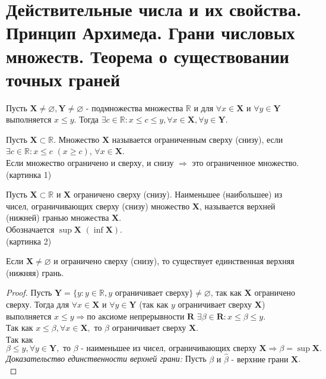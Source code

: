 \section{Действительные числа и их свойства. Принцип Архимеда. Грани числовых множеств. Теорема о существовании точных граней}

\begin{myax} 
	Пусть $\mathbf{X} \neq \varnothing, \mathbf{Y} \neq \varnothing$ - подмножества множества $\mathbb{R}$ и для $\forall x \in \mathbf{X}$ и $\forall y \in \mathbf{Y}$ выполняется $x \leq y$. Тогда $\exists c \in \mathbb{R}: x \leq c \leq y, \forall x \in \mathbf{X}, \forall y \in \mathbf{Y}$. 
\end{myax}

\begin{definition}
	Пусть $\mathbf{X} \subset \mathbb{R}$. Множество $\mathbf{X}$ называется ограниченным сверху (снизу), если $\exists c \in \mathbb{R}: x \leq c$ $(x \geq c)$, $\forall x \in \mathbf{X}$. \\
	Если множество ограничено и сверху, и снизу $\Rightarrow$ это ограниченное множество. \\
	(картинка 1)
\end{definition}

\begin{definition}
	Пусть $\mathbf{X} \subset \mathbb{R}$ и $\mathbf{X}$ ограничено сверху (снизу). Наименьшее (наибольшее) из чисел, ограничивающих сверху (снизу) множество $\mathbf{X}$, называется верхней (нижней) гранью множества $\mathbf{X}$. \\
	Обозначается $\sup \mathbf{X}$ $(\inf \mathbf{X})$. \\
	(картинка 2)
\end{definition}

\begin{theorem}
	Если $\mathbf{X} \neq \varnothing$ и ограничено сверху (снизу), то существует единственная верхняя (нижняя) грань.
\end{theorem}

\begin{proof}
	Пусть $\mathbf{Y} = \{y: y \in \mathbb{R}, y \mbox{ ограничивает сверху}\} \neq \varnothing$, так как $\mathbf{X}$ ограничено сверху. Тогда для $\forall x \in \mathbf{X}$ и $\forall y \in \mathbf{Y}$ (так как $y$ ограничивает сверху $\mathbf{X}$) выполняется $x \leq y \Rightarrow \mbox{по аксиоме непрерывности } \mathbf{R}$ $\exists \beta \in \mathbf{R}: x \leq \beta \leq y$. \\
	Так как $x \leq \beta, \forall x \in \mathbf{X}, \mbox{ то } \beta \mbox{ ограничивает сверху } \mathbf{X}.$ \\
	Так как $\beta \leq y, \forall y \in \mathbf{Y}, \mbox{ то } \beta \mbox{ - наименьшее из чисел, ограничивающих сверху } \mathbf{X} \Rightarrow \beta = \sup \mathbf{X}.$ \\
	\textit{Доказательство единственности верхней грани:} Пусть $\beta \mbox{ и } \hat{\beta} \mbox{ - верхние грани } \textbf{X}$. \\
	
\end{proof}